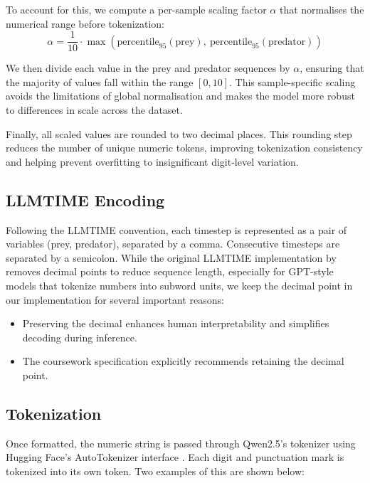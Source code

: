 \documentclass[a4paper,12pt]{article}
\begin{document}
To account for this, we compute a per-sample scaling factor $\alpha$ that normalises the numerical range before tokenization:
\begin{equation}
\alpha = \frac{1}{10} \cdot \max\left(\text{percentile}_{95}(\text{prey}),\ \text{percentile}_{95}(\text{predator})\right)
\end{equation}

We then divide each value in the prey and predator sequences by $\alpha$, ensuring that the majority of values fall within the range $[0, 10]$. This sample-specific scaling avoids the limitations of global normalisation and makes the model more robust to differences in scale across the dataset.

Finally, all scaled values are rounded to two decimal places. This rounding step reduces the number of unique numeric tokens, improving tokenization consistency and helping prevent overfitting to insignificant digit-level variation.


\subsection*{LLMTIME Encoding}

Following the LLMTIME convention, each timestep is represented as a pair of variables (prey, predator), separated by a comma. Consecutive timesteps are separated by a semicolon. While the original LLMTIME implementation by \citet{gruver2023language} removes decimal points to reduce sequence length, especially for GPT-style models that tokenize numbers into subword units, we keep the decimal point in our implementation for several important reasons:

\begin{itemize}
  \item Preserving the decimal enhances human interpretability and simplifies decoding during inference.
  \item The coursework specification explicitly recommends retaining the decimal point.
\end{itemize}

\subsection*{Tokenization}

Once formatted, the numeric string is passed through Qwen2.5’s tokenizer using Hugging Face’s AutoTokenizer interface \cite{huggingface}. Each digit and punctuation mark is tokenized into its own token. Two examples of this are shown below:
\end{document}
